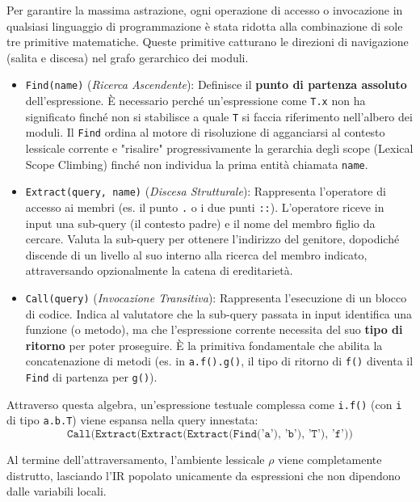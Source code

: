 Per garantire la massima astrazione, ogni operazione di accesso o
invocazione in qualsiasi linguaggio di programmazione è stata ridotta
alla combinazione di sole tre primitive matematiche. Queste primitive
catturano le direzioni di navigazione (salita e discesa) nel grafo
gerarchico dei moduli.

\begin{itemize}
  \item \texttt{Find(name)} (\textit{Ricerca Ascendente}): Definisce
    il \textbf{punto di partenza assoluto} dell'espressione. È
    necessario perché un'espressione come \texttt{T.x} non ha
    significato finché non si stabilisce a quale \texttt{T} si faccia
    riferimento nell'albero dei moduli. Il \texttt{Find} ordina al
    motore di risoluzione di agganciarsi al contesto lessicale
    corrente e "risalire" progressivamente la gerarchia degli scope
    (Lexical Scope Climbing) finché non individua la prima entità chiamata
    \texttt{name}.
  \item \texttt{Extract(query, name)} (\textit{Discesa Strutturale}):
    Rappresenta l'operatore di accesso ai membri (es. il punto
    \texttt{.} o i due punti \texttt{::}). L'operatore riceve in
    input una sub-query (il contesto padre) e il nome del membro
    figlio da cercare. Valuta la sub-query per ottenere l'indirizzo
    del genitore, dopodiché discende di un livello al suo interno
    alla ricerca del membro indicato, attraversando opzionalmente la
    catena di ereditarietà.
  \item \texttt{Call(query)} (\textit{Invocazione Transitiva}):
    Rappresenta l'esecuzione di un blocco di codice. Indica al
    valutatore che la sub-query passata in input identifica una
    funzione (o metodo), ma che l'espressione corrente necessita del
    suo \textbf{tipo di ritorno} per poter proseguire. È la primitiva
    fondamentale che abilita la concatenazione di metodi (es. in
      \texttt{a.f().g()}, il tipo di ritorno di \texttt{f()} diventa il
    \texttt{Find} di partenza per \texttt{g()}).
\end{itemize}

Attraverso questa algebra, un'espressione testuale complessa come
\texttt{i.f()} (con \texttt{i} di tipo \texttt{a.b.T}) viene espansa
nella query innestata:
$$ \texttt{Call(Extract(Extract(Extract(Find('a'), 'b'), 'T'), 'f'))} $$

Al termine dell'attraversamento, l'ambiente lessicale $\rho$ viene
completamente distrutto, lasciando l'IR popolato unicamente da
espressioni che non dipendono dalle variabili locali.

